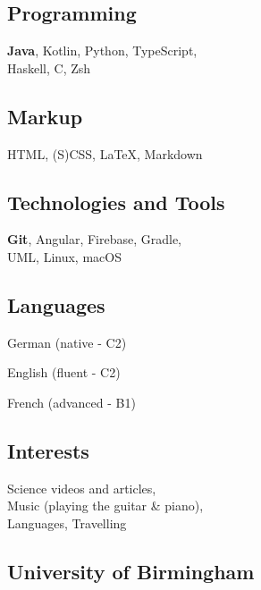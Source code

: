 \documentclass[]{jonas-cv}
\begin{document}
\begin{minipage}[t]{0.33\textwidth} 


\tinysectionsep
\subsection{Programming}
\textbf{Java}, Kotlin, Python, TypeScript, \\Haskell, C, Zsh
\sectionsep

\subsection{Markup}
HTML, (S)CSS, \LaTeX, Markdown
\sectionsep

\subsection{Technologies and Tools}
\textbf{Git}, Angular, Firebase, Gradle,\\ UML, Linux, macOS
\sectionsep

\subsection{Languages}
\tinysectionsep
\tinysectionsep
\begin{tightemize}
    \item German (native - C2)
    \item English (fluent - C2)
    \item French (advanced - B1)
\end{tightemize}
\sectionsep 

\subsection{Interests}
Science videos and articles,\\
Music (playing the guitar \& piano),\\
Languages, Travelling
\largesectionsep

\vspace{1mm}

\tinysectionsep
\vspace{0.25mm}
\subsection{University of Birmingham}
\sectionsep


\end{minipage}
\end{document}
